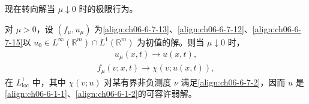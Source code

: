 \documentclass[../../main.tex]{subfiles}
\begin{document}
现在转向解当 $\mu\downarrow 0$ 时的极限行为。

\begin{theorem}\label{theorem:ch06-6-7-4}
对 $\mu>0$，设 $(f_{\mu},u_{\mu})$ 为\eqref{align:ch06-6-7-13}、\eqref{align:ch06-6-7-12}、\eqref{align:ch06-6-7-15}以 $u_{0}\in L^{\infty}(\mathbb{R}^{m})\cap L^{1}(\mathbb{R}^{m})$ 为初值的解。则当 $\mu\downarrow 0$ 时，
\begin{align}
u_{\mu}(x,t)\to u(x,t),
\label{align:ch06-6-7-26}
\end{align}
\begin{align}
f_{\mu}(v;x,t)\to\chi(v;u(x,t)),
\label{align:ch06-6-7-27}
\end{align}
在 $L^{1}_{\mathrm{loc}}$ 中，其中 $\chi(v;u)$ 对某有界非负测度 $\nu$ 满足\eqref{align:ch06-6-7-2}，因而 $u$ 是\eqref{align:ch06-6-1-1}、\eqref{align:ch06-6-1-2}的可容许弱解。
\end{theorem}
\end{document}
